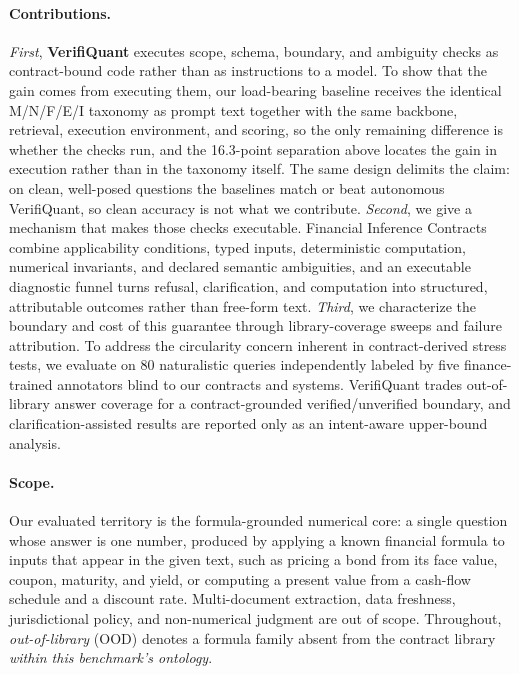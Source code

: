 \documentclass[sigconf,anonymous]{acmart}
\newcommand{\govGap}{16.3}                %
\begin{document}
\paragraph{Contributions.}
\emph{First}, \textbf{VerifiQuant} executes scope, schema, boundary, and ambiguity checks as contract-bound code rather than as instructions to a model. To show that the gain comes from executing them, our load-bearing baseline receives the identical M/N/F/E/I taxonomy as prompt text together with the same backbone, retrieval, execution environment, and scoring, so the only remaining difference is whether the checks run, and the \govGap{}-point separation above locates the gain in execution rather than in the taxonomy itself. The same design delimits the claim: on clean, well-posed questions the baselines match or beat autonomous VerifiQuant, so clean accuracy is not what we contribute.
\emph{Second}, we give a mechanism that makes those checks executable. Financial Inference Contracts combine applicability conditions, typed inputs, deterministic computation, numerical invariants, and declared semantic ambiguities, and an executable diagnostic funnel turns refusal, clarification, and computation into structured, attributable outcomes rather than free-form text.
\emph{Third}, we characterize the boundary and cost of this guarantee through library-coverage sweeps and failure attribution. To address the circularity concern inherent in contract-derived stress tests, we evaluate on 80 naturalistic queries independently labeled by five finance-trained annotators blind to our contracts and systems. VerifiQuant trades out-of-library answer coverage for a contract-grounded verified/unverified boundary, and clarification-assisted results are reported only as an intent-aware upper-bound analysis.

\paragraph{Scope.} Our evaluated territory is the formula-grounded numerical core: a single question whose answer is one number, produced by applying a known financial formula to inputs that appear in the given text, such as pricing a bond from its face value, coupon, maturity, and yield, or computing a present value from a cash-flow schedule and a discount rate.
Multi-document extraction, data freshness, jurisdictional policy, and non-numerical judgment are out of scope.
Throughout, \emph{out-of-library} (OOD) denotes a formula family absent from the contract library \emph{within this benchmark's ontology}.
\end{document}
